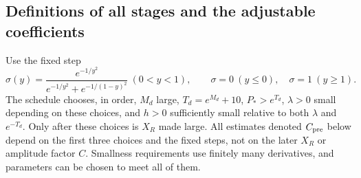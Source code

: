 \documentclass[10pt,a4paper]{article}
\begin{document}
\subsection{Definitions of all stages and the adjustable coefficients}
Use the fixed step
\[
\sigma(y)=\frac{e^{-1/y^2}}{e^{-1/y^2}+e^{-1/(1-y)^2}}\ (0<y<1),
\qquad \sigma=0\ (y\le0),\quad\sigma=1\ (y\ge1).
\]
The schedule chooses, in order, $M_d$ large, $T_d=e^{M_d}+10$,
$P_*>e^{T_d}$, $\lambda>0$ small depending on these choices, and
$h>0$ sufficiently small relative to both $\lambda$ and $e^{-T_d}$.
Only after these choices is $X_R$ made large. All estimates denoted $C_{\rm pre}$
below depend on the first three choices and the fixed steps, not on the later
$X_R$ or amplitude factor $C$. Smallness requirements use finitely many
derivatives, and parameters can be chosen to meet all of them.
\end{document}
